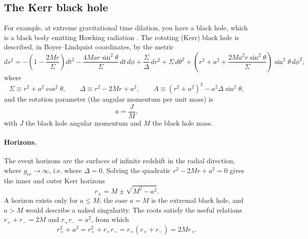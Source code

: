 \documentclass[10pt]{article}
\theoremstyle{definition}
\theoremstyle{remark}
\begin{document}
\subsection{The Kerr black hole}


For example, at extreme gravitational time dilation, you have a black hole, which is a black body emitting Hawking radiation \cite{schutz, hooft, jacobson, verlinde}. The rotating (Kerr) black hole is described, in Boyer--Lindquist coordinates, by the metric
\begin{equation}
ds^2 = -\left(1 - \frac{2Mr}{\Sigma}\right)dt^2 - \frac{4 M a r \sin^2\theta}{\Sigma}\,dt\,d\phi + \frac{\Sigma}{\Delta}\,dr^2 + \Sigma\,d\theta^2 + \left(r^2 + a^2 + \frac{2Ma^2 r\sin^2\theta}{\Sigma}\right)\sin^2\theta\,d\phi^2,
\end{equation}
where
\begin{equation}
\Sigma \equiv r^2 + a^2\cos^2\theta, \qquad \Delta \equiv r^2 - 2Mr + a^2, \qquad A \equiv (r^2 + a^2)^2 - a^2 \Delta \sin^2 \theta,
\end{equation}
and the rotation parameter (the angular momentum per unit mass) is
\begin{equation}
a = \frac{J}{M},
\end{equation}
with $J$ the black hole angular momentum and $M$ the black hole mass.

\paragraph{Horizons.} The event horizons are the surfaces of infinite redshift in the radial direction, where $g_{rr}\to\infty$, i.e. where $\Delta = 0$. Solving the quadratic $r^2 - 2Mr + a^2 = 0$ gives the inner and outer Kerr horizons
\begin{equation}\label{eq:horizons}
r_{\pm} = M \pm \sqrt{M^2 - a^2}.
\end{equation}
A horizon exists only for $a \le M$; the case $a = M$ is the extremal black hole, and $a > M$ would describe a naked singularity. The roots satisfy the useful relations $r_+ + r_- = 2M$ and $r_+ r_- = a^2$, from which
\begin{equation}\label{eq:identity}
r_+^2 + a^2 = r_+^2 + r_+ r_- = r_+(r_+ + r_-) = 2Mr_+ .
\end{equation}
\end{document}
